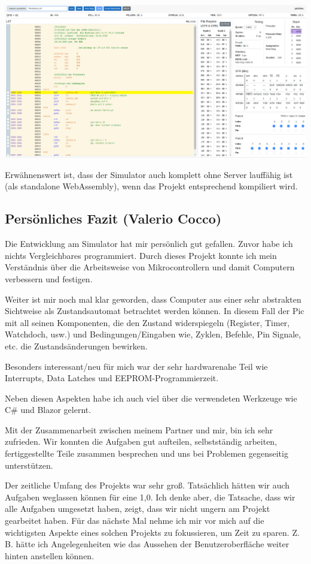 \includegraphics[width=\textwidth]{gui.png}

Erwähnenswert ist, dass der Simulator auch komplett ohne Server lauffähig ist (als standalone WebAssembly),
wenn das Projekt entsprechend kompiliert wird.


\subsection{Persönliches Fazit (Valerio Cocco)}
Die Entwicklung am Simulator hat mir persönlich gut gefallen.
Zuvor habe ich nichts Vergleichbares programmiert.
Durch dieses Projekt konnte ich mein Verständnis über die Arbeitsweise von Mikrocontrollern und damit Computern verbessern und festigen.

Weiter ist mir noch mal klar geworden,
dass Computer aus einer sehr abstrakten Sichtweise als Zustandsautomat betrachtet werden können.
In diesem Fall der Pic mit all seinen Komponenten, die den Zustand widerspiegeln (Register, Timer, Watchdoch, usw.)
und
Bedingungen/Eingaben wie, Zyklen, Befehle, Pin Signale, etc. die Zustandsänderungen bewirken.

Besonders interessant/neu für mich war der sehr hardwarenahe Teil wie Interrupts, Data Latches und EEPROM-Programmierzeit.

Neben diesen Aspekten habe ich auch viel über die verwendeten Werkzeuge wie C\# und Blazor gelernt.

Mit der Zusammenarbeit zwischen meinem Partner und mir, bin ich sehr zufrieden.
Wir konnten die Aufgaben gut aufteilen, selbstständig arbeiten,
fertiggestellte Teile zusammen besprechen und uns bei Problemen gegenseitig unterstützen.

Der zeitliche Umfang des Projekts war sehr groß.
Tatsächlich hätten wir auch Aufgaben weglassen können für eine 1,0.
Ich denke aber, die Tatsache, dass wir alle Aufgaben umgesetzt haben,
zeigt, dass wir nicht ungern am Projekt gearbeitet haben.
Für das nächste Mal nehme ich mir vor mich auf die wichtigsten Aspekte eines solchen Projekts zu fokussieren, um Zeit zu sparen.
Z. B. hätte ich Angelegenheiten wie das Aussehen der Benutzeroberfläche weiter hinten anstellen können.  



